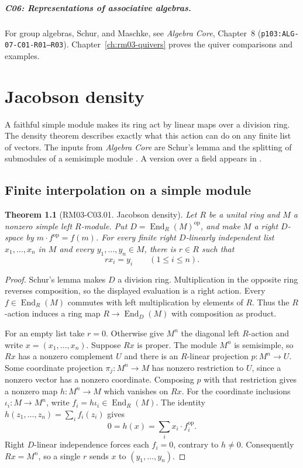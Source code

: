 \documentclass[11pt,oneside,openany]{book}
\newtheorem{theorem}{Theorem}[chapter]
\theoremstyle{definition}
\theoremstyle{remark}
\begin{document}
\paragraph{C06: Representations of associative algebras.}
For group algebras, Schur, and Maschke, see \emph{Algebra Core},
Chapter~8 (\texttt{p103:ALG-07-C01-R01--R03}).
Chapter~\ref{ch:rm03-quivers} proves the quiver comparisons and examples.

\mainmatter
\chapter{Jacobson density}
\label{ch:rm03-density}

A faithful simple module makes its ring act by linear maps over a
division ring. The density theorem describes exactly what this action
can do on any finite list of vectors. The inputs from \emph{Algebra Core}
are Schur's lemma and the splitting of submodules of a semisimple module
\cite[Ch.~3, ALG-03-C03-R03]{p103}. A version over a field appears in
\cite[Thm.~3.3]{mitdensity}.

\section{Finite interpolation on a simple module}

\begin{theorem}[RM03-C03.01. Jacobson density]
\label{thm:rm03-density}
Let \(R\) be a unital ring and \(M\) a nonzero simple left \(R\)-module.
Put \(D=\operatorname{End}_R(M)^{\mathrm{op}}\), and make \(M\) a right
\(D\)-space by \(m\cdot f^{\mathrm{op}}=f(m)\). For every finite
right \(D\)-linearly independent list \(x_1,\ldots,x_n\) in \(M\) and
every \(y_1,\ldots,y_n\in M\), there is \(r\in R\) such that
\[
   rx_i=y_i\qquad (1\leq i\leq n).
\]
\end{theorem}
\begin{proof}
Schur's lemma makes \(D\) a division ring. Multiplication in the
opposite ring reverses composition, so the displayed evaluation is a
right action. Every \(f\in\operatorname{End}_R(M)\) commutes with left
multiplication by elements of \(R\). Thus the \(R\)-action induces a
ring map \(R\to\operatorname{End}_D(M)\) with composition as product.

For an empty list take \(r=0\). Otherwise give \(M^n\) the diagonal
left \(R\)-action and write \(x=(x_1,\ldots,x_n)\). Suppose \(Rx\) is
proper. The module \(M^n\) is semisimple, so \(Rx\) has a nonzero
complement \(U\) and there is an \(R\)-linear projection \(p:M^n\to U\).
Some coordinate projection \(\pi_j:M^n\to M\) has nonzero restriction
to \(U\), since a nonzero vector has a nonzero coordinate. Composing
\(p\) with that restriction gives a nonzero map \(h:M^n\to M\) which
vanishes on \(Rx\). For the coordinate inclusions \(\iota_i:M\to M^n\),
write \(f_i=h\iota_i\in\operatorname{End}_R(M)\). The identity
\(h(z_1,\ldots,z_n)=\sum_i f_i(z_i)\) gives
\[
      0=h(x)=\sum_i x_i\cdot f_i^{\mathrm{op}}.
\]
Right \(D\)-linear independence forces each \(f_i=0\), contrary to
\(h\ne 0\). Consequently \(Rx=M^n\), so a single \(r\) sends \(x\)
to \((y_1,\ldots,y_n)\).
\end{proof}
\end{document}
